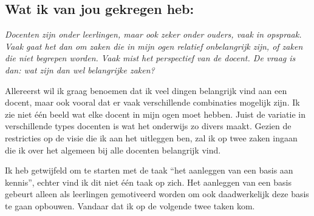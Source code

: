 \documentclass{article}
\begin{document}
        \subsection*{Wat ik van jou gekregen heb:}
            {\itshape              
                Docenten zijn onder leerlingen, maar ook zeker onder ouders, vaak in opspraak. Vaak gaat het dan om zaken die in mijn ogen relatief onbelangrijk zijn, of zaken die niet begrepen worden. Vaak mist het perspectief van de docent. De vraag is dan: wat zijn dan wel belangrijke zaken?
                
                Allereerst wil ik graag benoemen dat ik veel dingen belangrijk vind aan een docent, maar ook vooral dat er vaak verschillende combinaties mogelijk zijn. Ik zie niet één beeld wat elke docent in mijn ogen moet hebben. Juist de variatie in verschillende types docenten is wat het onderwijs zo divers maakt. Gezien de restricties op de visie die ik aan het uitleggen ben, zal ik op twee zaken ingaan die ik over het algemeen bij alle docenten belangrijk vind.
                
                Ik heb getwijfeld om te starten met de taak “het aanleggen van een basis aan kennis”, echter vind ik dit niet één taak op zich. Het aanleggen van een basis gebeurt alleen als leerlingen gemotiveerd worden om ook daadwerkelijk deze basis te gaan opbouwen. Vandaar dat ik op de volgende twee taken kom.
                
}
\end{document}
